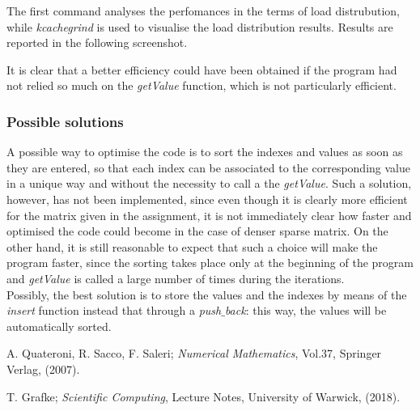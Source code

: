 \documentclass[11pt]{article}
\theoremstyle{theorem}
\theoremstyle{definition}
\begin{document}
The first command analyses the perfomances in the terms of load distrubution, while \emph{kcachegrind} is used to visualise the load distribution results. Results are reported in the following screenshot.


It is clear that a better efficiency could have been obtained if the program had not relied so much on the \emph{getValue} function, which is not particularly efficient.\\

\subsubsection{Possible solutions}
A possible way to optimise the code is to sort the indexes and values as soon as they are entered, so that each index can be associated to the corresponding value in a unique way and without the necessity to call a the \emph{getValue}. Such a solution, however, has not been implemented, since even though it is clearly more efficient for the matrix given in the assignment, it is not immediately clear how faster and optimised the code could become in the case of denser sparse matrix. On the other hand, it is still reasonable to expect that such a choice will make the program faster, since the sorting takes place only at the beginning of the program and \emph{getValue} is called a large number of times during the iterations.\\
Possibly, the best solution is to store the values and the indexes by means of the \emph{insert} function instead that through a \emph{push$\_$back}: this way, the values
 will be automatically sorted.\\



\cleardoublepage
\begin{thebibliography}{99}

 A. Quateroni, R. Sacco, F. Saleri;
\emph{Numerical Mathematics}, Vol.37, Springer Verlag, (2007).

 T. Grafke;
\emph{Scientific Computing}, Lecture Notes, University of Warwick, (2018).







\printindex
\end{thebibliography}
\end{document}
